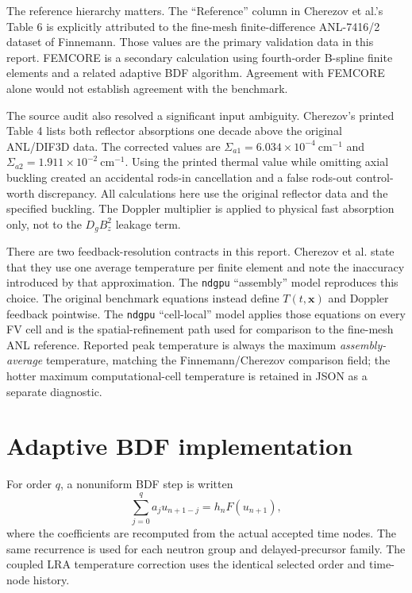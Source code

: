 \documentclass[10pt]{article}
\newcommand{\ndgpu}{\texttt{ndgpu}}
\begin{document}
The reference hierarchy matters. The ``Reference'' column in Cherezov et
al.'s Table 6 is explicitly attributed to the fine-mesh finite-difference
ANL-7416/2 dataset of Finnemann. Those values are the primary validation data
in this report. FEMCORE is a secondary calculation using fourth-order
B-spline finite elements and a related adaptive BDF algorithm. Agreement with
FEMCORE alone would not establish agreement with the benchmark.

The source audit also resolved a significant input ambiguity. Cherezov's
printed Table 4 lists both reflector absorptions one decade above the original
ANL/DIF3D data. The corrected values are
$\Sigma_{a1}=6.034\times10^{-4}\ \mathrm{cm}^{-1}$ and
$\Sigma_{a2}=1.911\times10^{-2}\ \mathrm{cm}^{-1}$. Using the printed thermal
value while omitting axial buckling created an accidental rods-in cancellation
and a false rods-out control-worth discrepancy. All calculations here use the
original reflector data and the specified buckling. The Doppler multiplier is
applied to physical fast absorption only, not to the $D_gB_z^2$ leakage term.

There are two feedback-resolution contracts in this report. Cherezov et al.
state that they use one average temperature per finite element and note the
inaccuracy introduced by that approximation. The \ndgpu{} ``assembly'' model
reproduces this choice. The original benchmark equations instead define
$T(t,\mathbf{x})$ and Doppler feedback pointwise. The \ndgpu{} ``cell-local''
model applies those equations on every FV cell and is the spatial-refinement
path used for comparison to the fine-mesh ANL reference. Reported peak
temperature is always the maximum \emph{assembly-average} temperature, matching
the Finnemann/Cherezov comparison field; the hotter maximum computational-cell
temperature is retained in JSON as a separate diagnostic.

\section{Adaptive BDF implementation}

For order $q$, a nonuniform BDF step is written
\begin{equation}
  \sum_{j=0}^{q} a_j u_{n+1-j}=h_n F(u_{n+1}),
\end{equation}
where the coefficients are recomputed from the actual accepted time nodes.
The same recurrence is used for each neutron group and delayed-precursor
family. The coupled LRA temperature correction uses the identical selected
order and time-node history.
\end{document}
